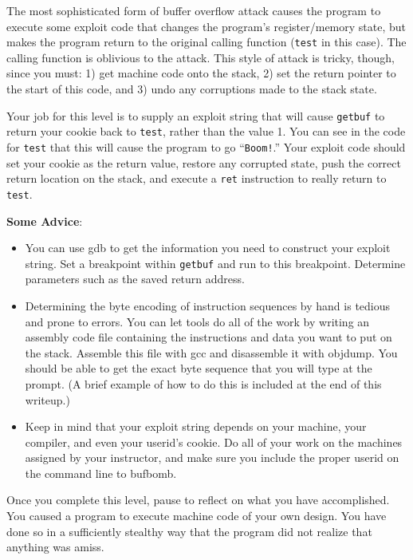 \documentclass[11pt]{article}
\begin{document}
The most sophisticated form of buffer overflow attack causes the
program to execute some exploit code that changes the program's
register/memory state, but makes the program return to the original
calling function (\texttt{test} in this case).  The calling function
is oblivious to the attack.  This style of attack is tricky, though,
since you must: 1) get machine code onto the stack, 2) set the return
pointer to the start of this code, and 3) undo any corruptions made to
the stack state.

Your job for this level is to supply an exploit string that will cause
{\tt getbuf} to return your cookie back to \texttt{test}, rather than
the value 1.  You can see in the code for {\tt test} that this will
cause the program to go ``{\tt Boom!}.''  Your exploit code should set
your cookie as the return value, restore any corrupted state, push the
correct return location on the stack, and execute a {\tt ret}
instruction to really return to {\tt test}.

{\bf Some Advice}:
\begin{itemize}

\item 
You can use {\sc gdb} to get the information you need to construct
your exploit string.  Set a breakpoint within {\tt getbuf} and run to
this breakpoint.  Determine parameters such as the saved return
address.

\item
Determining the byte encoding of instruction sequences by hand is
tedious and prone to errors.  You can let tools do all of the work by
writing an assembly code file containing the instructions and data you
want to put on the stack.  Assemble this file with {\sc gcc} and
disassemble it with {\sc objdump}.  You should be able to get the
exact byte sequence that you will type at the prompt.  
(A brief example of how to do this is included at the end of this writeup.)

\item
Keep in mind that your exploit string depends on your machine, your
compiler, and even your userid's cookie.  Do all of your work on the
machines assigned by your instructor, and make sure you include the
proper userid on the command line to {\sc bufbomb}.
\end{itemize}

Once you complete this level, pause to reflect on what you have
accomplished.  You caused a program to execute machine code of your
own design.  You have done so in a sufficiently stealthy way that the
program did not realize that anything was amiss.
\end{document}
